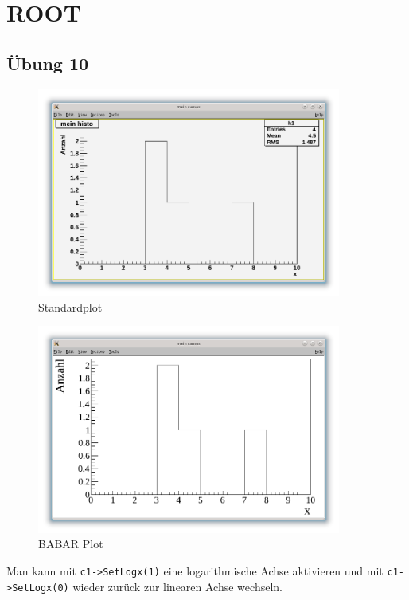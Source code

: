 
\part{ROOT}

\chapter{Übung 10}

\begin{figure}[h]
\begin{center}
\includegraphics[width=10cm]{Uebung_10/default.png}
\caption{Standardplot}
\end{center}
\end{figure}



\begin{figure}[h]
\begin{center}
\includegraphics[width=10cm]{Uebung_10/babar.png}
\caption{BABAR Plot}
\end{center}
\end{figure}

Man kann mit \texttt{c1->SetLogx(1)} eine logarithmische Achse aktivieren und mit \texttt{c1->SetLogx(0)} wieder zurück zur linearen Achse wechseln.

